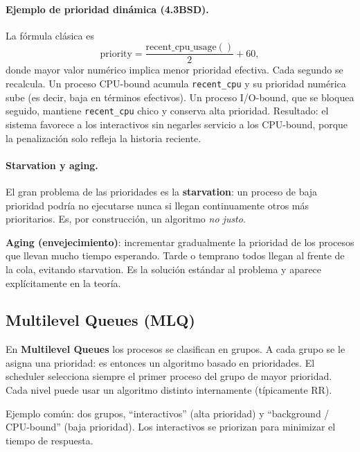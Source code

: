 \documentclass[11pt,a4paper]{article}
\begin{document}
\paragraph{Ejemplo de prioridad dinámica (4.3BSD).} La fórmula
clásica es
\[
\text{priority} = \frac{\text{recent\_cpu\_usage}()}{2} + 60,
\]
donde mayor valor numérico implica menor prioridad efectiva. Cada
segundo se recalcula. Un proceso CPU-bound acumula
\texttt{recent\_cpu} y su prioridad numérica sube (es decir, baja en
términos efectivos). Un proceso I/O-bound, que se bloquea seguido,
mantiene \texttt{recent\_cpu} chico y conserva alta prioridad.
Resultado: el sistema favorece a los interactivos sin negarles
servicio a los CPU-bound, porque la penalización solo refleja la
historia reciente.

\paragraph{Starvation y aging.} El gran problema de las prioridades
es la \textbf{starvation}: un proceso de baja prioridad podría no
ejecutarse nunca si llegan continuamente otros más prioritarios. Es,
por construcción, un algoritmo \emph{no justo}.

\begin{importante}
\textbf{Aging (envejecimiento)}: incrementar gradualmente la
prioridad de los procesos que llevan mucho tiempo esperando. Tarde o
temprano todos llegan al frente de la cola, evitando starvation. Es
la solución estándar al problema y aparece explícitamente en la
teoría.
\end{importante}

\subsection{Multilevel Queues (MLQ)}

\begin{definicion}
En \textbf{Multilevel Queues} los procesos se clasifican en grupos.
A cada grupo se le asigna una prioridad: es entonces un algoritmo
basado en prioridades. El scheduler selecciona siempre el primer
proceso del grupo de mayor prioridad. Cada nivel puede usar un
algoritmo distinto internamente (típicamente RR).
\end{definicion}

Ejemplo común: dos grupos, ``interactivos'' (alta prioridad) y
``background / CPU-bound'' (baja prioridad). Los interactivos se
priorizan para minimizar el tiempo de respuesta.
\end{document}
